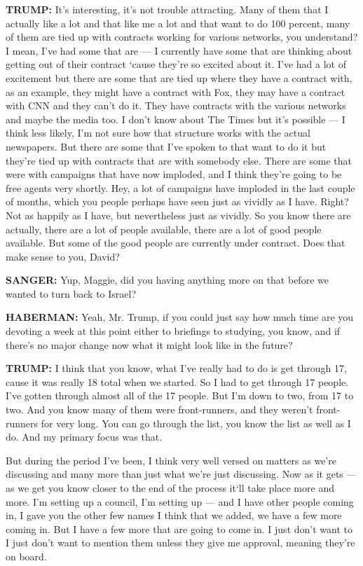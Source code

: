 \textbf{TRUMP:} It's interesting, it's not trouble attracting. Many of
them that I actually like a lot and that like me a lot and that want to
do 100 percent, many of them are tied up with contracts working for
various networks, you understand? I mean, I've had some that are --- I
currently have some that are thinking about getting out of their
contract `cause they're so excited about it. I've had a lot of
excitement but there are some that are tied up where they have a
contract with, as an example, they might have a contract with Fox, they
may have a contract with CNN and they can't do it. They have contracts
with the various networks and maybe the media too. I don't know about
The Times but it's possible --- I think less likely, I'm not sure how
that structure works with the actual newspapers. But there are some that
I've spoken to that want to do it but they're tied up with contracts
that are with somebody else. There are some that were with campaigns
that have now imploded, and I think they're going to be free agents very
shortly. Hey, a lot of campaigns have imploded in the last couple of
months, which you people perhaps have seen just as vividly as I have.
Right? Not as happily as I have, but nevertheless just as vividly. So
you know there are actually, there are a lot of people available, there
are a lot of good people available. But some of the good people are
currently under contract. Does that make sense to you, David?

\textbf{SANGER:} Yup, Maggie, did you having anything more on that
before we wanted to turn back to Israel?

\textbf{HABERMAN:} Yeah, Mr. Trump, if you could just say how much time
are you devoting a week at this point either to briefings to studying,
you know, and if there's no major change now what it might look like in
the future?

\textbf{TRUMP:} I think that you know, what I've really had to do is get
through 17, cause it was really 18 total when we started. So I had to
get through 17 people. I've gotten through almost all of the 17 people.
But I'm down to two, from 17 to two. And you know many of them were
front-runners, and they weren't front-runners for very long. You can go
through the list, you know the list as well as I do. And my primary
focus was that.

But during the period I've been, I think very well versed on matters as
we're discussing and many more than just what we're just discussing. Now
as it gets --- as we get you know closer to the end of the process it`ll
take place more and more. I'm setting up a council, I'm setting up ---
and I have other people coming in, I gave you the other few names I
think that we added, we have a few more coming in. But I have a few more
that are going to come in. I just don't want to I just don't want to
mention them unless they give me approval, meaning they're on board.

